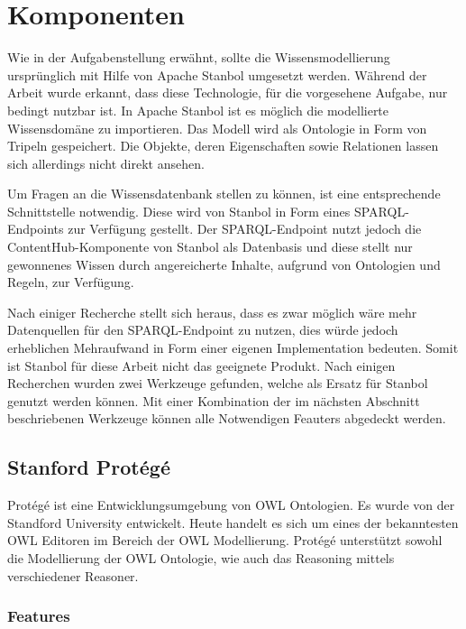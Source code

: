 \chapter{Komponenten}
\label{chap:komponenten}
Wie in der Aufgabenstellung erwähnt, sollte die Wissensmodellierung ursprünglich mit Hilfe von Apache Stanbol umgesetzt werden. Während der Arbeit wurde erkannt, dass diese Technologie, für die vorgesehene Aufgabe, nur bedingt nutzbar  ist. In Apache Stanbol ist es möglich die modellierte Wissensdomäne zu importieren. Das Modell wird als Ontologie in Form von Tripeln gespeichert. Die Objekte, deren Eigenschaften sowie Relationen lassen sich allerdings nicht direkt ansehen.

Um Fragen an die Wissensdatenbank stellen zu können, ist eine entsprechende Schnittstelle notwendig. Diese wird von Stanbol in Form eines SPARQL-Endpoints zur Verfügung gestellt. Der SPARQL-Endpoint nutzt jedoch die ContentHub-Komponente von Stanbol als Datenbasis und diese stellt nur gewonnenes Wissen durch angereicherte Inhalte, aufgrund von Ontologien und Regeln, zur Verfügung.

Nach einiger Recherche stellt sich heraus, dass es zwar möglich wäre mehr Datenquellen für den SPARQL-Endpoint zu nutzen, dies würde jedoch erheblichen Mehraufwand in Form einer eigenen Implementation bedeuten. Somit ist Stanbol für diese Arbeit nicht das geeignete Produkt. Nach einigen Recherchen wurden zwei Werkzeuge gefunden, welche als Ersatz für Stanbol genutzt werden können. Mit einer Kombination der im nächsten Abschnitt beschriebenen Werkzeuge können alle Notwendigen Feauters abgedeckt werden.


\section{Stanford Protégé}
\label{sec:komponenten_protege}

Protégé ist eine Entwicklungsumgebung von OWL Ontologien. Es wurde von der Standford University entwickelt. Heute handelt es sich um  eines der bekanntesten OWL Editoren im Bereich der OWL Modellierung.
Protégé unterstützt sowohl die Modellierung der OWL Ontologie, wie auch das Reasoning mittels verschiedener Reasoner.


\subsection{Features}
\label{subsec:komponenten_protege_features}


